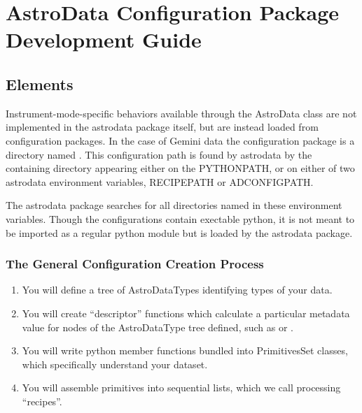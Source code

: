 \documentclass[letterpaper,10pt,english]{sphinxmanual}
\begin{document}
\chapter{AstroData Configuration Package Development Guide}
\label{developmentGuide:astrodata-configuration-package-development-guide}\label{developmentGuide::doc}

\section{Elements}
\label{configElements:elements}\label{configElements::doc}
Instrument-mode-specific behaviors available through the AstroData class
are not implemented in the astrodata package itself, but are instead loaded from
configuration packages. In the case of Gemini data the
configuration package is a directory named .  This
configuration path is found by astrodata by the containing directory
appearing either on the PYTHONPATH, or on either of two astrodata environment
variables, RECIPEPATH or ADCONFIGPATH.

The astrodata package searches for all directories named 
in these environment variables.  Though the configurations contain
exectable python, it is not meant to be imported as a regular python module but
is loaded by the astrodata package.


\subsection{The General Configuration Creation Process}
\label{configElements:the-general-configuration-creation-process}\begin{enumerate}
\item {} 
You will define a tree of AstroDataTypes identifying types of your data.

\item {} 
You will create ``descriptor'' functions which calculate a particular metadata
value for nodes of the AstroDataType tree defined,
such as  or .

\item {} 
You will write python member functions bundled into PrimitivesSet classes,
which specifically understand your dataset.

\item {} 
You will assemble primitives into sequential lists, which we call  processing
``recipes''.

\end{enumerate}
\end{document}
